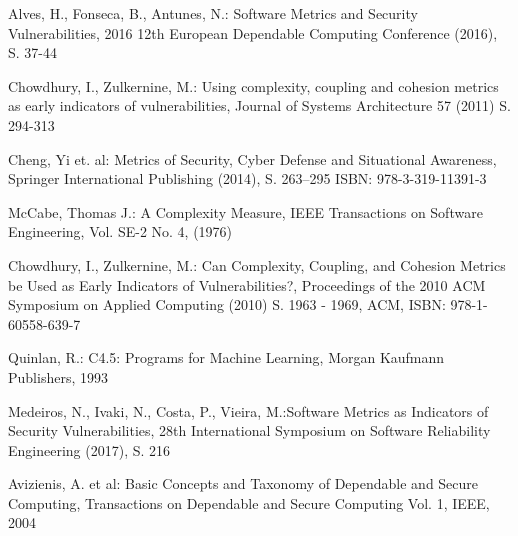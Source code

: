
\begin{thebibliography}{8}
Alves, H., Fonseca, B., Antunes, N.: Software Metrics and Security Vulnerabilities, 2016 12th European Dependable Computing Conference (2016), S. 37-44

Chowdhury, I., Zulkernine, M.: Using complexity, coupling and cohesion metrics as early indicators of vulnerabilities, Journal of Systems Architecture 57 (2011) S. 294-313

Cheng, Yi et. al: Metrics of Security, Cyber Defense and Situational Awareness, Springer International Publishing (2014), S. 263--295
ISBN: 978-3-319-11391-3

McCabe, Thomas J.: A Complexity Measure, IEEE Transactions on Software Engineering, Vol. SE-2 No. 4, (1976)

Chowdhury, I., Zulkernine, M.: Can Complexity, Coupling, and Cohesion Metrics be Used as Early Indicators of Vulnerabilities?, Proceedings of the 2010 ACM Symposium on Applied Computing (2010) S. 1963 - 1969, ACM, ISBN: 978-1-60558-639-7

Quinlan, R.: C4.5: Programs for Machine Learning, Morgan Kaufmann Publishers, 1993

Medeiros, N., Ivaki, N., Costa, P., Vieira, M.:Software Metrics as Indicators of Security Vulnerabilities, 28th International Symposium on Software Reliability Engineering (2017), S. 216

Avizienis, A. et al: Basic Concepts and Taxonomy of Dependable and Secure Computing, Transactions on Dependable and Secure Computing Vol. 1, IEEE, 2004

\end{thebibliography}
